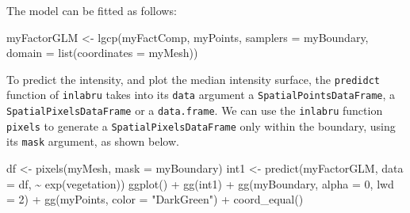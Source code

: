 \documentclass[
]{article}
\newenvironment{Shaded}{\begin{snugshade}}{\end{snugshade}}
\newcommand{\AttributeTok}[1]{\textcolor[rgb]{0.77,0.63,0.00}{#1}}
\newcommand{\DecValTok}[1]{\textcolor[rgb]{0.00,0.00,0.81}{#1}}
\newcommand{\FunctionTok}[1]{\textcolor[rgb]{0.00,0.00,0.00}{#1}}
\newcommand{\NormalTok}[1]{#1}
\newcommand{\OtherTok}[1]{\textcolor[rgb]{0.56,0.35,0.01}{#1}}
\newcommand{\SpecialCharTok}[1]{\textcolor[rgb]{0.00,0.00,0.00}{#1}}
\newcommand{\StringTok}[1]{\textcolor[rgb]{0.31,0.60,0.02}{#1}}
\begin{document}
\begin{Shaded}
\end{Shaded}

The model can be fitted as follows:

\begin{Shaded}
\begin{Highlighting}[]
\NormalTok{myFactorGLM }\OtherTok{\textless{}{-}} \FunctionTok{lgcp}\NormalTok{(myFactComp, myPoints, }\AttributeTok{samplers =}\NormalTok{ myBoundary, }\AttributeTok{domain =} \FunctionTok{list}\NormalTok{(}\AttributeTok{coordinates =}\NormalTok{ myMesh))}
\end{Highlighting}
\end{Shaded}

To predict the intensity, and plot the median intensity surface, the
\texttt{predidct} function of \texttt{inlabru} takes into its
\texttt{data} argument a \texttt{SpatialPointsDataFrame}, a
\texttt{SpatialPixelsDataFrame} or a \texttt{data.frame}. We can use the
\texttt{inlabru} function \texttt{pixels} to generate a
\texttt{SpatialPixelsDataFrame} only within the boundary, using its
\texttt{mask} argument, as shown below.

\begin{Shaded}
\begin{Highlighting}[]
\NormalTok{df }\OtherTok{\textless{}{-}} \FunctionTok{pixels}\NormalTok{(myMesh, }\AttributeTok{mask =}\NormalTok{ myBoundary)}
\NormalTok{int1 }\OtherTok{\textless{}{-}} \FunctionTok{predict}\NormalTok{(myFactorGLM, }\AttributeTok{data =}\NormalTok{ df, }\SpecialCharTok{\textasciitilde{}} \FunctionTok{exp}\NormalTok{(vegetation))}
\FunctionTok{ggplot}\NormalTok{() }\SpecialCharTok{+}
  \FunctionTok{gg}\NormalTok{(int1) }\SpecialCharTok{+}
  \FunctionTok{gg}\NormalTok{(myBoundary, }\AttributeTok{alpha =} \DecValTok{0}\NormalTok{, }\AttributeTok{lwd =} \DecValTok{2}\NormalTok{) }\SpecialCharTok{+}
  \FunctionTok{gg}\NormalTok{(myPoints, }\AttributeTok{color =} \StringTok{"DarkGreen"}\NormalTok{) }\SpecialCharTok{+}
  \FunctionTok{coord\_equal}\NormalTok{()}
\end{Highlighting}
\end{Shaded}
\end{document}
